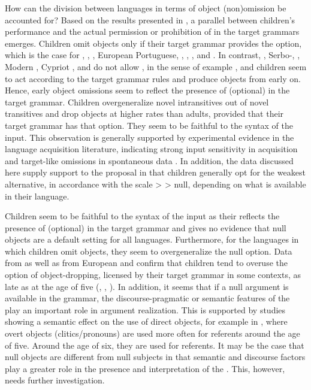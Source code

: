 \documentclass[output=paper,modfonts,newtxmath,hidelinks,]{langscibook}
\begin{document}
How can the division between languages in terms of object (non)omission be accounted for? Based on the results presented in , a parallel between children’s performance and the actual permission or prohibition of  in the target grammars emerges. Children omit objects only if their target grammar provides the  option, which is the case for , , , European Portuguese, , , , and . In contrast, , Serbo-, , Modern , Cypriot , and  do not allow , in the sense of example , and children seem to act according to the target grammar rules and produce objects from early on. Hence, early object omissions seem to reflect the presence of (optional)  in the target grammar. Children overgeneralize novel intransitives out of novel transitives and drop objects at higher rates than adults, provided that their target grammar has that option. They seem to be faithful to the syntax of the input. This observation is generally supported by experimental evidence in the language acquisition literature, indicating strong input sensitivity in acquisition and target-like omissions in spontaneous data \citep{Ingham1993}. In addition, the data discussed here supply support to the proposal in \citet{Varlokosta-etal2016} that children generally opt for the weakest alternative, in accordance with the scale  >  > null, depending on what is available in their language.

Children seem to be faithful to the syntax of the input as their  reflects the presence of (optional)  in the target grammar and gives no evidence that null objects are a default setting for all languages. Furthermore, for the languages in which children omit objects, they seem to overgeneralize the null option. Data from  as well as from European and  confirm that children tend to overuse the option of object-dropping, licensed by their target grammar in some contexts, as late as at the age of five (\citealt{Wang-etal1992}, \citealt{Costa-etal2012}, \citealt{Lopes2009}). In addition, it seems that if a null argument is available in the grammar, the discourse-pragmatic or semantic features of the   play an important role in argument realization. This is supported by studies showing a semantic effect on the use of direct objects, for example in , where overt objects (clitics/pronouns) are used more often for  referents around the age of five. Around the age of six, they are used for  referents. It may be the case that null objects are different from null subjects in that semantic and discourse factors play a greater role in the presence and interpretation of the . This, however, needs further investigation.
\end{document}
